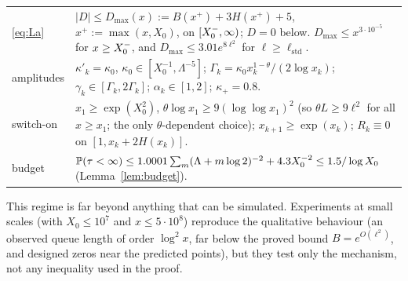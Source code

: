 \begin{center}
\begin{tabular}{@{}p{2.1cm}p{12.4cm}@{}}
\eqref{eq:La} & $|D|\le D_{\max}(x):=B(x^+)+3H(x^+)+5$, $x^+:=\max(x,X_0)$, on $[X_0^{-},\infty)$; $D=0$ below. $D_{\max}\le x^{3\cdot10^{-5}}$ for $x\ge X_0^{-}$,
and $D_{\max}\le3.01e^{8\ell^2}$ for $\ell\ge\ell_{\mathrm{std}}$. \\
amplitudes & $\kappa'_k=\kappa_0$, $\kappa_0\in[X_0^{-1},\Lambda^{-5}]$; $\Gamma_k=\kappa_0x_k^{1-\theta}/(2\log x_k)$;
$\gamma_k\in[\Gamma_k,2\Gamma_k]$; $\alpha_k\in[1,2]$; $\kappa_+=0.8$. \\
switch-on & $x_1\ge\exp(X_0^2)$, $\theta\log x_1\ge9(\log\log x_1)^2$ (so $\theta L\ge9\ell^2$ for all $x\ge x_1$; the only
$\theta$-dependent choice); $x_{k+1}\ge\exp(x_k)$; $R_k\equiv0$ on $[1,x_k+2H(x_k)]$. \\
budget & $\mathbb{P}(\tau<\infty)\le1.0001\sum_m(\Lambda+m\log2)^{-2}+4.3X_0^{-2}\le1.5/\log X_0$ (Lemma~\ref{lem:budget}). \\ \hline
\end{tabular}
\end{center}
This regime is far beyond anything that can be simulated. Experiments at small scales (with $X_0\le10^7$ and
$x\le5\cdot10^8$) reproduce the qualitative behaviour (an observed queue length of order $\log^2x$, far below the proved bound
$B=e^{O(\ell^2)}$, and designed zeros near the predicted points), but they test only the mechanism, not any inequality used in
the proof.

